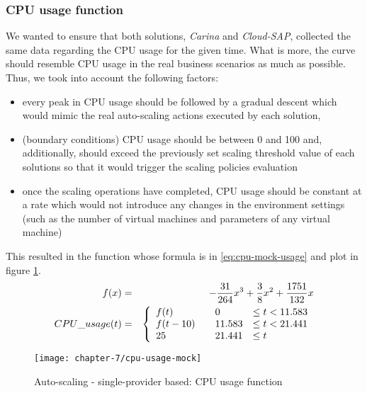 \subsubsection*{CPU usage function}
We wanted to ensure that both solutions, \emph{Carina} and \emph{Cloud-SAP}, collected the same data regarding the CPU usage for the given time. What is more, the curve should resemble CPU usage in the real business scenarios as much as possible. Thus, we took into account the following factors:
\begin{itemize}
  \item every peak in CPU usage should be followed by a gradual descent which would mimic the real auto-scaling actions executed by each solution,
  \item (boundary conditions) CPU usage should be between 0 and 100 and, additionally, should exceed the previously set scaling threshold value of each solutions so that it would trigger the scaling policies evaluation
  \item once the scaling operations have completed, CPU usage should be constant at a rate which would not introduce any changes in the environment settings (such as the number of virtual machines and parameters of any virtual machine)
\end{itemize}
This resulted in the function whose formula is in \eqref{eq:cpu-mock-usage} and plot in figure \ref{eval:auto-scaling-1cp-cpu-usage-function}.
\begin{eqnarray}
  f(x) &=& -\frac{31}{264}x^3+\frac{3}{8}x^2+\frac{1751}{132}x \nonumber \\
  CPU\_usage(t) &=& \left\{
  \begin{array}{l l l}
    f(t) & \quad 0 & \le t < 11.583 \\
    f(t-10) & \quad 11.583 & \le t < 21.441 \\
    25 & \quad 21.441 & \le  t \\
\end{array} \right.
\label{eq:cpu-mock-usage}
\end{eqnarray}

\begin{figure}[!ht]
  \begin{center}
    \texttt{[image: chapter-7/cpu-usage-mock]}
  \end{center}
  \caption{Auto-scaling - single-provider based: CPU usage function}
  \label{eval:auto-scaling-1cp-cpu-usage-function}
\end{figure}

